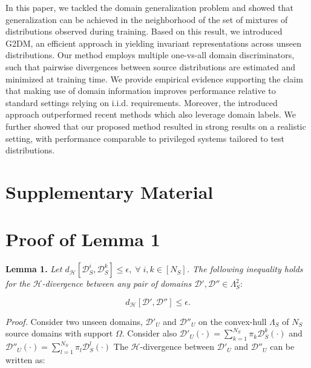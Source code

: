 \documentclass{article}
\begin{document}
In this paper, we tackled the domain generalization problem and showed that generalization can be achieved in the neighborhood of the set of mixtures of distributions observed during training. Based on this result, we introduced G2DM, an efficient approach in yielding invariant representations across unseen distributions. Our method employs multiple one-vs-all domain discriminators, such that pairwise divergences between source distributions are estimated and minimized at training time. We provide empirical evidence supporting the claim that making use of domain information improves performance relative to standard settings relying on i.i.d. requirements. Moreover, the introduced approach outperformed recent methods which also leverage domain labels. We further showed that our proposed method resulted in strong results on a realistic setting, with performance comparable to privileged systems tailored to test distributions. 




















\clearpage
\appendix
\section*{Supplementary Material}

\section{Proof of Lemma 1}
\textbf{Lemma 1.} \textit{Let $d_{\mathcal{H}}[\mathcal{D}^i_S, \mathcal{D}^k_S]\leq \epsilon, \; \forall \; i,k \in[N_S]$. The following inequality holds for the $\mathcal{H}$-divergence between any pair of domains $\mathcal{D}', \mathcal{D}'' \in \Lambda_S^2$}:

\begin{equation}
    d_{\mathcal{H}}[\mathcal{D}', \mathcal{D}''] \leq  \epsilon. 
\end{equation}

\textit{Proof.} Consider two unseen domains, $\mathcal{D}'_U$ and $\mathcal{D}''_U$ on the convex-hull $\Lambda_S$ of $N_S$ source domains with support $\Omega$. Consider also $\mathcal{D}'_U(\cdot) = \sum_{k=1}^{N_S} \pi_{k} \mathcal{D}_S^k(\cdot)$ and $\mathcal{D}''_U(\cdot) = \sum_{l=1}^{N_S} \pi_{l} \mathcal{D}_S^l(\cdot)$
The $\mathcal{H}$-divergence between $\mathcal{D}'_U$ and $\mathcal{D}''_U$ can be written as:
\end{document}
